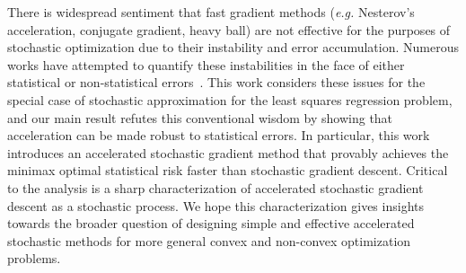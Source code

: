 

There is widespread sentiment that fast gradient methods (\emph{e.g.}
Nesterov's acceleration, conjugate gradient, heavy ball) are not
effective for the purposes of stochastic optimization due to their
instability and error accumulation. Numerous works have attempted to
quantify these instabilities in the face of either statistical or
non-statistical
errors~\citep{Paige71,Proakis74,Polyak87,Greenbaum89,DevolderGN14}.
This work considers these issues for the special case of
stochastic approximation for the least squares regression problem, and
our main result refutes this conventional wisdom by showing that
acceleration can be made robust to statistical errors.  In
particular, this work introduces an accelerated stochastic gradient
method that provably achieves the minimax optimal statistical risk
faster than stochastic gradient descent.  Critical to the analysis is
a sharp characterization of accelerated stochastic gradient descent as
a stochastic process. We hope this characterization gives insights
towards the broader question of designing simple and effective
accelerated stochastic methods for more general convex and non-convex
optimization problems.


\iffalse
There is widespread sentiment that fast gradient methods (\emph{e.g.}
Nesterov's acceleration, conjugate gradient, heavy ball) are not
effective for the purposes of stochastic optimization due to their
instability and error accumulation, a notion made precise
in~\cite{dAspremont08,DevolderGN14}.  This work considers the use of
fast gradient methods for the special case of stochastic approximation for the
least squares regression problem.  Our main
result refutes the conventional wisdom by showing that acceleration can
be made robust to \emph{statistical} errors.  In particular, this work
introduces an accelerated stochastic gradient method that provably
achieves the minimax optimal statistical risk faster than stochastic
gradient descent.  Critical to the analysis is a sharp
characterization of accelerated stochastic gradient descent as a
stochastic process. We hope this characterization gives insights
towards the broader question of designing simple and effective
accelerated stochastic methods for more general convex and non-convex
optimization problems.
\fi